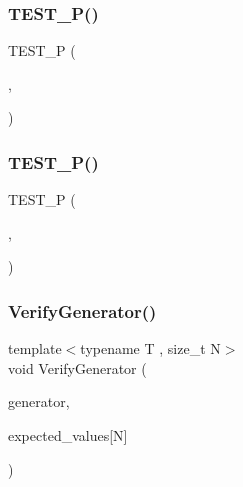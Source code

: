 \subsubsection{\texorpdfstring{TEST\_P()}{TEST\_P()}\hspace{0.1cm}{\footnotesize\ttfamily [17/18]}}
{\footnotesize\ttfamily T\+E\+S\+T\+\_\+P (\begin{DoxyParamCaption}\item[{\mbox{\hyperlink{class_parameterized_derived_test}{Parameterized\+Derived\+Test}}}]{,  }\item[{Sees\+Sequence}]{ }\end{DoxyParamCaption})}

\mbox{\label{googletest-master_2googletest_2test_2googletest-param-test-test_8cc_af93c1bfa3f3b8f1670128c9afc5143b2}} 
\subsubsection{\texorpdfstring{TEST\_P()}{TEST\_P()}\hspace{0.1cm}{\footnotesize\ttfamily [18/18]}}
{\footnotesize\ttfamily T\+E\+S\+T\+\_\+P (\begin{DoxyParamCaption}\item[{\mbox{\hyperlink{class_my_enum_test}{My\+Enum\+Test}}}]{,  }\item[{Checks\+Param\+More\+Than\+Zero}]{ }\end{DoxyParamCaption})}

\mbox{\label{googletest-master_2googletest_2test_2googletest-param-test-test_8cc_a11c99cfbf44746868aa44105130887f7}} 
\subsubsection{\texorpdfstring{VerifyGenerator()}{VerifyGenerator()}}
{\footnotesize\ttfamily template$<$typename T , size\+\_\+t N$>$ \\
void Verify\+Generator (\begin{DoxyParamCaption}\item[{const Param\+Generator$<$ T $>$ \&}]{generator,  }\item[{const T(\&)}]{expected\+\_\+values\mbox{[}\+N\mbox{]} }\end{DoxyParamCaption})}

